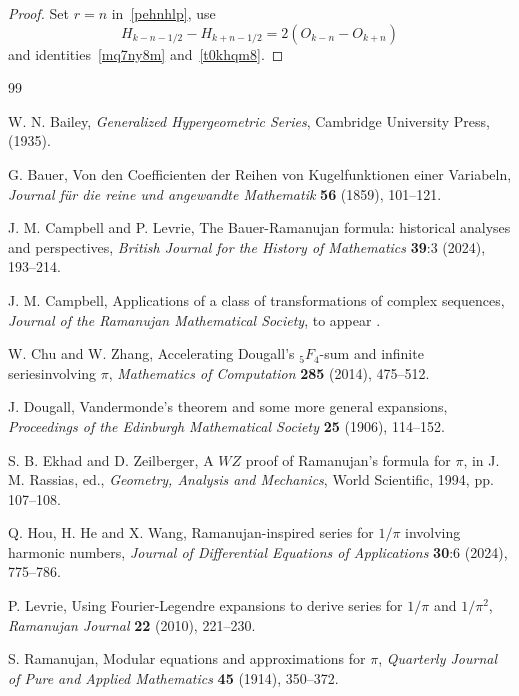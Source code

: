 \documentclass[12pt,reqno]{article}
\begin{document}
\begin{proof}
Set $r=n$ in~\eqref{pehnhlp}, use
\begin{equation*}
H_{k - n - 1/2}  - H_{k + n - 1/2}  = 2\left( {O_{k - n}  - O_{k + n} } \right)
\end{equation*}
and identities~\eqref{mq7ny8m} and~\eqref{t0khqm8}.
\end{proof}
\begin{thebibliography}{99}

 W. N. Bailey, \emph{Generalized Hypergeometric Series}, Cambridge University Press, (1935).

 G. Bauer, Von den Coefficienten der Reihen von Kugelfunktionen einer Variabeln, \emph{Journal f\"ur die reine und angewandte Mathematik} {\bf 56} (1859), 101--121.

 J. M. Campbell and P. Levrie, The Bauer-Ramanujan formula: historical analyses and perspectives, \emph{British Journal for the History of Mathematics} {\bf 39}:3 (2024), 193--214.

 J. M. Campbell, Applications of a class of transformations of complex sequences, \emph{Journal of the Ramanujan Mathematical Society}, to appear .

 W. Chu and W. Zhang, Accelerating Dougall's  ${}_5F_4$-sum and infinite seriesinvolving $\pi$, \emph{Mathematics of Computation} {\bf 285} (2014), 475--512.

 J. Dougall, Vandermonde's theorem and some more general expansions, \emph{Proceedings of the Edinburgh Mathematical Society} {\bf 25} (1906), 114--152.

 S. B. Ekhad and D. Zeilberger, A $WZ$ proof of Ramanujan's formula for $\pi$, in J. M. Rassias, ed., \emph{Geometry, Analysis and Mechanics}, World Scientific, 1994, pp. 107--108.

 Q. Hou, H. He and X. Wang, Ramanujan-inspired series for $1/\pi$ involving harmonic numbers, \emph{Journal of Differential Equations of Applications} {\bf 30}:6 (2024), 775--786.

 P. Levrie, Using Fourier-Legendre expansions to derive series for $1/\pi$ and $1/\pi^2$, \emph{Ramanujan Journal} {\bf 22} (2010), 221--230.

 S. Ramanujan, Modular equations and approximations for $\pi$, \emph{Quarterly Journal of Pure and Applied Mathematics} {\bf 45} (1914), 350--372.

\end{thebibliography}
\end{document}
